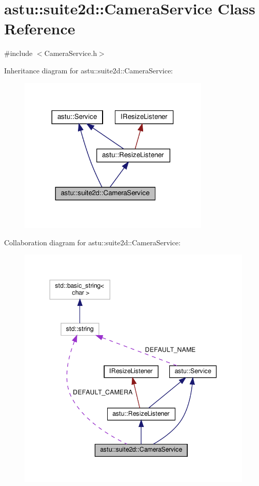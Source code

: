 \hypertarget{classastu_1_1suite2d_1_1CameraService}{}\section{astu\+:\+:suite2d\+:\+:Camera\+Service Class Reference}
\label{classastu_1_1suite2d_1_1CameraService}


{\ttfamily \#include $<$Camera\+Service.\+h$>$}



Inheritance diagram for astu\+:\+:suite2d\+:\+:Camera\+Service\+:\nopagebreak
\begin{figure}[H]
\begin{center}
\leavevmode
\includegraphics[width=258pt]{classastu_1_1suite2d_1_1CameraService__inherit__graph}
\end{center}
\end{figure}


Collaboration diagram for astu\+:\+:suite2d\+:\+:Camera\+Service\+:\nopagebreak
\begin{figure}[H]
\begin{center}
\leavevmode
\includegraphics[width=344pt]{classastu_1_1suite2d_1_1CameraService__coll__graph}
\end{center}
\end{figure}
